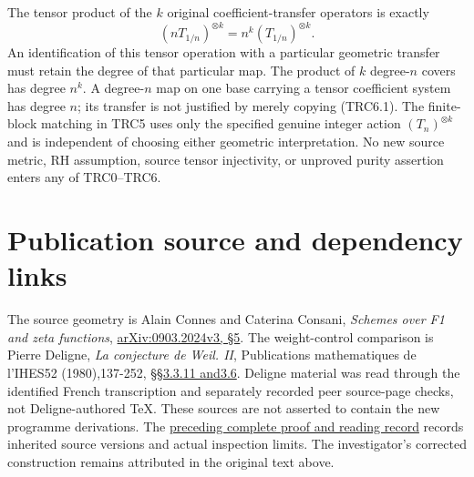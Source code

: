 The tensor product of the \(k\) original coefficient-transfer operators
is exactly \[
(nT_{1/n})^{\otimes k}=n^k(T_{1/n})^{\otimes k}.
\tag{TRC6.1}
\] An identification of this tensor operation with a particular
geometric transfer must retain the degree of that particular map. The
product of \(k\) degree-\(n\) covers has degree \(n^k\). A degree-\(n\)
map on one base carrying a tensor coefficient system has degree \(n\);
its transfer is not justified by merely copying (TRC6.1). The
finite-block matching in TRC5 uses only the specified genuine integer
action \((T_n)^{\otimes k}\) and is independent of choosing either
geometric interpretation. No new source metric, RH assumption, source
tensor injectivity, or unproved purity assertion enters any of
TRC0--TRC6.

\section{Publication source and dependency
links}\label{publication-source-and-dependency-links-13}

The source geometry is Alain Connes and Caterina Consani, \emph{Schemes
over F1 and zeta functions},
\href{https://arxiv.org/abs/0903.2024v3}{arXiv:0903.2024v3, §5}. The
weight-control comparison is Pierre Deligne, \emph{La conjecture de
Weil. II}, Publications mathematiques de l'IHES52 (1980),137-252,
\href{https://www.numdam.org/item/PMIHES_1980__52__137_0/}{§§3.3.11
and3.6}. Deligne material was read through the identified French
transcription and separately recorded peer source-page checks, not
Deligne-authored TeX. These sources are not asserted to contain the new
programme derivations. The
\href{https://github.com/KokunoYumeto/zeta-function-research-reader/blob/36a82ecca98addb8a98b48204e349737856c7223/workbenches/splitzero-tandem/continuations/20260924-cohomology-weight-and-character-lifts/BUILD_AND_REVIEW.md}{preceding
complete proof and reading record} records inherited source versions and
actual inspection limits. The investigator's corrected construction
remains attributed in the original text above.

